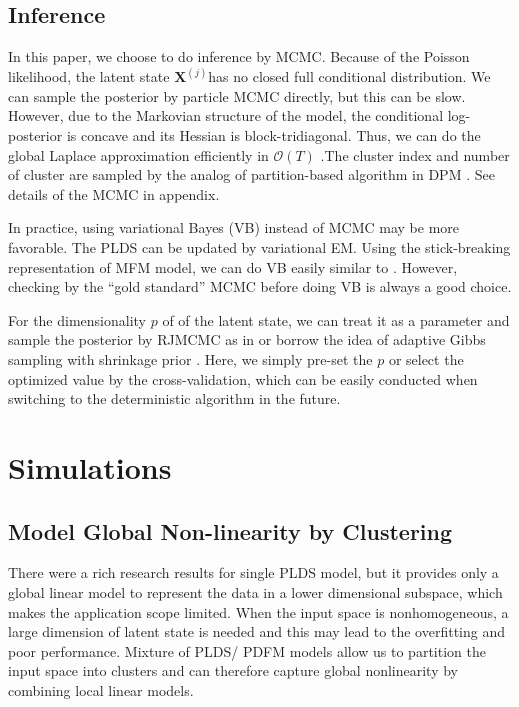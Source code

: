 \documentclass{article}
\begin{document}
	\subsection{Inference}
	
	In this paper, we choose to do inference by MCMC. Because of the Poisson likelihood, the latent state $\bm{X}^{(j)}$has no closed full conditional distribution. We can sample the posterior by particle MCMC directly, but this can be slow. However, due to the Markovian structure of the model, the conditional log-posterior is concave and its Hessian is block-tridiagonal. Thus, we can do the global Laplace approximation efficiently in $\mathcal{O}(T)$ \citep{Paninski2010}.The cluster index and number of cluster are sampled by the analog of partition-based algorithm in DPM \citep{Neal2000}. See details of the MCMC in appendix.
	
	In practice, using variational Bayes (VB) instead of MCMC may be more favorable. The PLDS can be updated by variational EM. Using the stick-breaking representation of MFM model, we can do VB easily similar to \citet{Blei2006}. However, checking by the “gold standard” MCMC before doing VB is always a good choice.
	
	For the dimensionality $p$ of of the latent state, we can treat it as a parameter and sample the posterior by RJMCMC as in \citet{Lopes2004} or borrow the idea of adaptive Gibbs sampling with shrinkage prior \citep{Bhattacharya2011}. Here, we simply pre-set the $p$ or select the optimized value by the cross-validation, which can be easily conducted when switching to the deterministic algorithm in the future. 
	
	\section{Simulations}
	\label{sim}
	
	\subsection{Model Global Non-linearity by Clustering}
	There were a rich research results for single PLDS model, but it provides only a global linear model to represent the data in a lower dimensional subspace, which makes the application scope limited. When the input space is nonhomogeneous, a large dimension of latent state is needed and this may lead to the overfitting and poor performance. Mixture of PLDS/ PDFM models allow us to partition the input space into clusters and can therefore capture global nonlinearity by combining local linear models.
	
\end{document}
